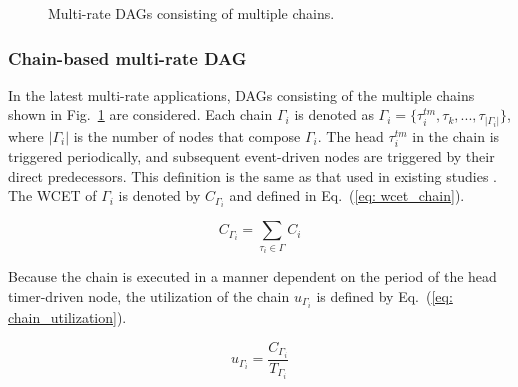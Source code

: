 \begin{figure}[tb]
    \centering
    \caption{Multi-rate DAGs consisting of multiple chains.}
    \label{fig: chain_dag}
\end{figure}


\subsubsection{Chain-based multi-rate DAG}
\label{sssec: dag_chain}

In the latest multi-rate applications, DAGs consisting of the multiple chains shown in Fig.~\ref{fig: chain_dag} are considered.
Each chain $\Gamma_i$ is denoted as $\Gamma_i = \{\tau^{tm}_i, \tau_k, ..., \tau_{|\Gamma_i|}\}$, where $|\Gamma_i|$ is the number of nodes that compose $\Gamma_i$.
The head $\tau^{tm}_i$ in the chain is triggered periodically, and subsequent event-driven nodes are triggered by their direct predecessors.
This definition is the same as that used in existing studies \cite{choi2020chain, tang2020response}.
The WCET of $\Gamma_i$ is denoted by $C_{\Gamma_i}$ and defined in Eq.~(\ref{eq: wcet_chain}).

\begin{equation}
    \label{eq: wcet_chain}
    C_{\Gamma_i} = \sum_{\tau_i \in \Gamma}C_i
\end{equation}

Because the chain is executed in a manner dependent on the period of the head timer-driven node, the utilization of the chain $u_{\Gamma_i}$ is defined by Eq.~(\ref{eq: chain_utilization}).

\begin{equation}
    \label{eq: chain_utilization}
    u_{\Gamma_i} = \frac{C_{\Gamma_i}}{T_{\Gamma_i}}
\end{equation}

